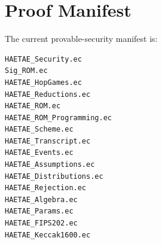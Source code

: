 \chapter{Proof Manifest}
\label{app:manifest}

The current provable-security manifest is:

\begin{lstlisting}[language=bash]
HAETAE_Security.ec
Sig_ROM.ec
HAETAE_HopGames.ec
HAETAE_Reductions.ec
HAETAE_ROM.ec
HAETAE_ROM_Programming.ec
HAETAE_Scheme.ec
HAETAE_Transcript.ec
HAETAE_Events.ec
HAETAE_Assumptions.ec
HAETAE_Distributions.ec
HAETAE_Rejection.ec
HAETAE_Algebra.ec
HAETAE_Params.ec
HAETAE_FIPS202.ec
HAETAE_Keccak1600.ec
\end{lstlisting}
